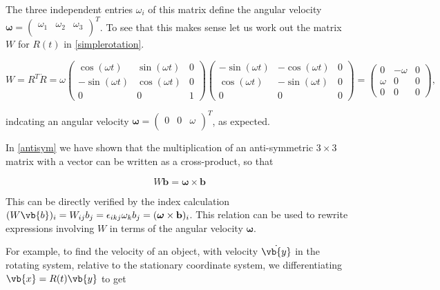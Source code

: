 \documentclass[a4paper,12pt]{report}
\begin{document}
The three independent entries \(\omega_i\) of this matrix define the angular velocity \(\boldsymbol{\omega} = \begin{pmatrix}
    \omega _{1}  & \omega _{2}  & \omega _{3}   \\
\end{pmatrix}^T\). To see that this makes sense let us work out the matrix \( W \) for \(R(t)\) in \cref{simplerotation}.

\begin{equation}
W = R^T \dot{R} = \omega
\begin{pmatrix}
\cos(\omega t) & \sin(\omega t) & 0 \\
-\sin(\omega t) & \cos(\omega t) & 0 \\
0 & 0 & 1
\end{pmatrix}
\begin{pmatrix}
-\sin(\omega t) & -\cos(\omega t) & 0 \\
\cos(\omega t) & -\sin(\omega t) & 0 \\
0 & 0 & 0
\end{pmatrix}
=
\begin{pmatrix}
0 & -\omega & 0 \\
\omega & 0 & 0 \\
0 & 0 & 0
\end{pmatrix},
\end{equation}

indcating an angular velocity \(\boldsymbol{\omega } = \begin{pmatrix}
    0 & 0 &  \omega  \\
\end{pmatrix}^T \), as expected.

In \cref{antisym} we have shown that the multiplication of an anti-symmetric \(3 \times 3\) matrix with a vector can be written as a cross-product, so that

\begin{equation}
W \mathbf{b} = \boldsymbol{\omega} \times \mathbf{b}
\end{equation}

This can be directly verified by the index calculation \( (W\vb{b})_{i} = W_{ij} b_j = \epsilon_{ikj} \omega_k b_j = (\boldsymbol{\omega} \times \mathbf{b})_i \). This relation can be used to rewrite expressions involving \( W \) in terms of the angular velocity \(\boldsymbol{\omega}\).

For example, to find the velocity of an object, with velocity \(\dot{\vb{y} } \) in the rotating system, relative to the stationary coordinate system, we differentiating \(\vb{x} = R(t)\vb{y} \) to get
\end{document}
